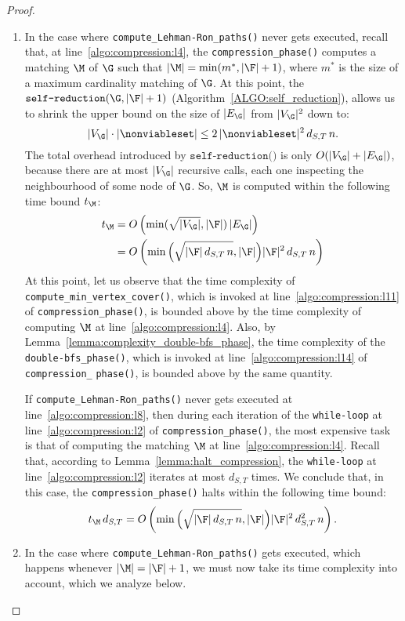 \begin{proof}
\begin{enumerate}
    \item In the case where  \texttt{compute\_Lehman-Ron\_paths()} never gets executed,
    recall that, at line~\ref{algo:compression:l4}, the \texttt{compression\_phase()}
computes a matching $\M$ of $\G$ such that $|\M|=\min(m^*, |\F|+1)$, where $m^*$ is the
size of a maximum cardinality matching of $\G$.
At this point, the $\texttt{self-reduction}(\G, |\F|+1)$ (Algorithm~\ref{ALGO:self_reduction}),
allows us to shrink the upper bound on the size of $|E_\G|$ from $|V_\G|^2$ down to:
\[|V_\G|\cdot |\nonviableset| \leq 2\,|\nonviableset|^2\, d_{S,T}\, n.\]
The total overhead introduced by $\texttt{self-reduction()}$ is only $O(|V_\G| + |E_\G|)$,
because there are at most $|V_\G|$ recursive calls, each one inspecting the neighbourhood of some node of $\G$.
So, $\M$ is computed within the following time bound $t_\M$:
\begin{align*}
t_\M & = O\left(\min(\sqrt{|V_\G|}, |\F|)\,|E_\G|\right)  \\
     & = O\left(\min\Big(\sqrt{|\F|\, d_{S,T}\, n}, |\F|\Big) |\F|^2\, d_{S,T}\, n \right)
\end{align*}
At this point, let us observe that the time complexity of \texttt{compute\_min\_vertex\_cover()},
which is invoked at line~\ref{algo:compression:l11} of \texttt{compression\_phase()},
is bounded above by the time complexity of computing $\M$ at line~\ref{algo:compression:l4}.
Also, by Lemma~\ref{lemma:complexity_double-bfs_phase},
the time complexity of the \texttt{double-bfs\_phase()}, which is invoked at line~\ref{algo:compression:l14}
of \texttt{compression\_} \texttt{phase()}, is bounded above by the same quantity.


If \texttt{compute\_Lehman-Ron\_paths()} never gets executed at line~\ref{algo:compression:l8},
then during each iteration of the \texttt{while-loop}
at line~\ref{algo:compression:l2} of \texttt{compression\_phase()},
the most expensive task is that of computing the matching $\M$ at line~\ref{algo:compression:l4}.
Recall that, according to
Lemma~\ref{lemma:halt_compression}, the \texttt{while-loop}
at line~\ref{algo:compression:l2} iterates at most $d_{S,T}$ times.
We conclude that, in this case, the \texttt{compression\_phase()} halts within the following time bound:
\[t_\M\, d_{S,T} = O\left(\min\Big(\sqrt{|\F|\, d_{S,T}\, n}, |\F|\Big) |\F|^2\, d^2_{S,T}\, n \right).\]

    \item In the case where  \texttt{compute\_Lehman-Ron\_paths()} gets executed,
    which happens whenever $|\M|=|\F|+1$, we must now take its time complexity into account, which we analyze below.


\end{enumerate}
\end{proof}
